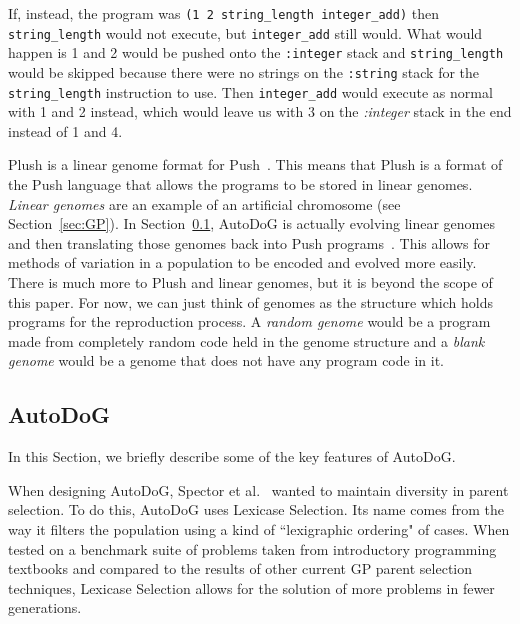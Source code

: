 \documentclass{sig-alternate}
\begin{document}
If, instead, the program was \texttt{(1 2 string\_length integer\_add)} then \texttt{string\_length} would not execute, but \texttt{integer\_add} still would. What would happen is 1 and 2 would be pushed onto the \texttt{:integer} stack and \texttt{string\_length} would be skipped because there were no strings on the \texttt{:string} stack for the \texttt{string\_length} instruction to use. Then \texttt{integer\_add} would execute as normal with 1 and 2 instead, which would leave us with 3 on the \textit{:integer} stack in the end instead of 1 and 4.

Plush is a linear genome format for Push~\cite{spector:2016}. This means that Plush is a format of the Push language that allows the programs to be stored in linear genomes. \textit{Linear genomes} are an example of an artificial chromosome (see Section~\ref{sec:GP}). In Section~\ref{sec:autodog}, AutoDoG is actually evolving linear genomes and then translating those genomes back into Push programs~\cite{spector:2016}. This allows for methods of variation in a population to be encoded and evolved more easily. There is much more to Plush and linear genomes, but it is beyond the scope of this paper. For now, we can just think of genomes as the structure which holds programs for the reproduction process. A \textit{random genome} would be a program made from completely random code held in the genome structure and a \textit{blank genome} would be a genome that does not have any program code in it.

\subsection{AutoDoG}
\label{sec:autodog}
In this Section, we briefly describe some of the key features of AutoDoG.

When designing AutoDoG, Spector et al.~\cite{spector:2016} wanted to maintain diversity in parent selection. To do this, AutoDoG uses Lexicase Selection. Its name comes from the way it filters the population using a kind of ``lexigraphic ordering" of cases. When tested on a benchmark suite of problems taken from introductory programming textbooks and compared to the results of other current GP parent selection techniques, Lexicase Selection allows for the solution of more problems in fewer generations.
\end{document}
